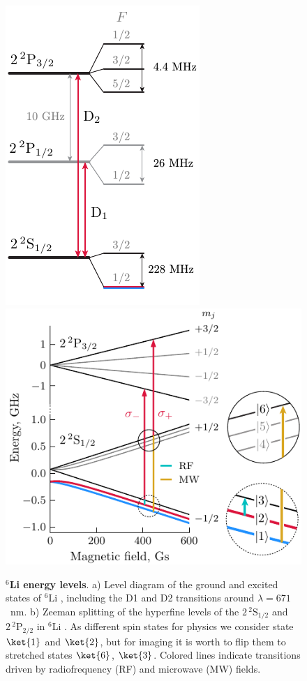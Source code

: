 \begin{figure}[htb]
    \centering
    \includegraphics{fig-ai/li-levels-base.pdf}
    \hspace{1cm}
    \includegraphics{fig-ai/li6-zeeman-broken-ai.pdf}
    \caption{
        \textbf{${}^6$Li energy levels}. 
        a) Level diagram of the ground and excited states of ${}^6$Li \cite{gehm_preparation_2003}, including the D1 and D2 transitions around $\lambda = 671$~nm. 
        b) Zeeman splitting of the hyperfine levels of the $2\, {}^2\mathrm{S}_{1/2}$ and $2\, {}^2\mathrm{P}_{2/2}$ in ${}^6$Li \cite{serwane_deterministic_2011, sibalic_arc_2017}. As different spin states for physics we consider state $\ket{1}$ and $\ket{2}$, but for imaging it is worth to flip them to stretched states $\ket{6}$, $\ket{3}$. Colored lines indicate transitions driven by radiofrequency (RF) and microwave (MW) fields.
    }
    \label{fig:li6levels}
\end{figure}


